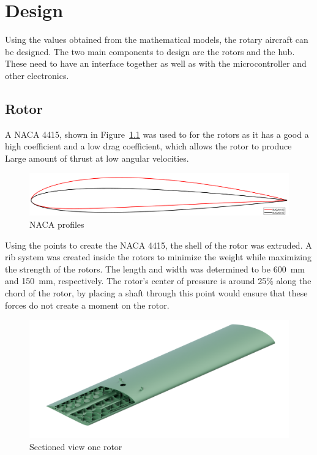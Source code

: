 \chapter{Design}
\label{sec: design}
Using the values obtained from the mathematical models, the rotary aircraft can be designed. The two main components to design are the rotors and the hub. These need to have an interface together as well as with the microcontroller and other electronics.
    \section{Rotor}
            A NACA 4415, shown in Figure~\ref{fig: NACA_Profiles} was used to for the rotors as it has a good a high coefficient and a low drag coefficient, which allows the rotor to produce Large amount of thrust at low angular velocities.
            \begin{figure}[h]
                \centering
                \includegraphics*[width = \textwidth]{figs/Design/Rotor/NACA_Profile.png}
                \caption{NACA profiles}
                \label{fig: NACA_Profiles}
            \end{figure}
            Using the points to create the NACA 4415, the shell of the rotor was extruded. A rib system was created inside the rotors to minimize the weight  while maximizing the strength of the rotors. The length and width was determined to be 600~mm and 150~mm, respectively. The rotor's center of pressure is around 25\% along the chord of the rotor, by placing a shaft through this point would ensure that these forces do not create a moment on the rotor.

            \begin{figure}[h]
                \centering
                \includegraphics*[width = \textwidth]{figs/Design/Rotor/Rotor_Sectioned_Light.png}
                \caption{Sectioned view one rotor}
                \label{fig: sectioned_rotor}
            \end{figure}

